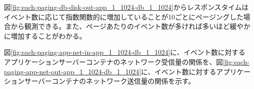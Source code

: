 \documentclass[../../../../main]{subfiles}
\begin{document}
    

    図\ref{fig:each-paging-db-disk-out-app_1_1024-db_1_1024}からレスポンスタイムはイベント数に応じて指数関数的に増加していることが10ごとにページングした場合から観測できる。また、ページあたりのイベント数が多ければ多いほど緩やかに増加することがわかる。

    \label{subsubsubsec:result-each-paging-only-limit-net-io}

    図\ref{fig:each-paging-app-net-in-app_1_1024-db_1_1024}に、イベント数に対するアプリケーションサーバーコンテナのネットワーク受信量の関係を、図\ref{fig:each-paging-app-net-out-app_1_1024-db_1_1024}に、イベント数に対するアプリケーションサーバーコンテナのネットワーク送信量の関係を示す。

    
    
\end{document}
